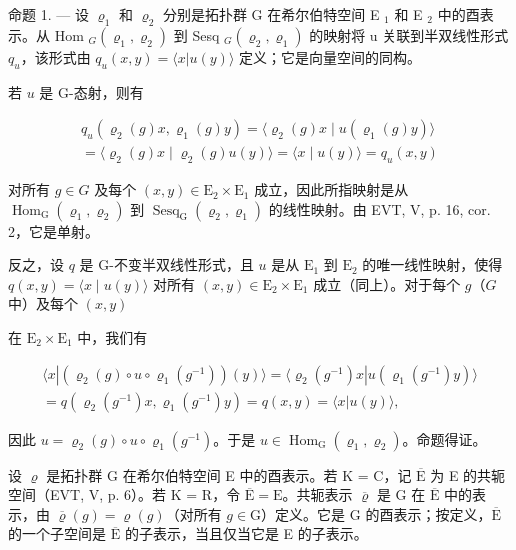 命题 1. --- 设 \(\varrho_{1}\) 和 \(\varrho_{2}\) 分别是拓扑群 G 在希尔伯特空间 E \(_{1}\) 和 E \(_{2}\) 中的酉表示。从 Hom \(_{G}(\varrho_{1},\varrho_{2})\) 到 Sesq \(_{G}(\varrho_{2},\varrho_{1})\) 的映射将 u 关联到半双线性形式 \(q_{u}\)，该形式由 \(q_{u}(x,y)=\langle x|u(y)\rangle\) 定义；它是向量空间的同构。

若 \(u\) 是 G-态射，则有

\[
\begin{array}{c} q _ {u} (\varrho_ {2} (g) x, \varrho_ {1} (g) y) = \langle \varrho_ {2} (g) x \mid u (\varrho_ {1} (g)y) \rangle \\ = \langle \varrho_ {2} (g) x \mid \varrho_ {2} (g) u (y) \rangle = \langle x \mid u (y) \rangle = q _ {u} (x, y) \end{array}
\]

对所有 \(g \in G\) 及每个 \((x, y) \in \mathrm{E}_{2} \times \mathrm{E}_{1}\) 成立，因此所指映射是从 \(\operatorname{Hom}_{\mathrm{G}}(\varrho_{1}, \varrho_{2})\) 到 \(\operatorname{Sesq}_{\mathrm{G}}(\varrho_{2}, \varrho_{1})\) 的线性映射。由 EVT, V, p. 16, cor. 2，它是单射。

反之，设 \(q\) 是 G-不变半双线性形式，且 \(u\) 是从 \(\mathrm{E}_1\) 到 \(\mathrm{E}_2\) 的唯一线性映射，使得 \(q(x,y) = \langle x \mid u(y) \rangle\) 对所有 \((x,y) \in \mathrm{E}_2 \times \mathrm{E}_1\) 成立（同上）。对于每个 \(g\)（\(G\) 中）及每个 \((x,y)\)

在 \(\mathrm{E}_2\times \mathrm{E}_1\) 中，我们有

\[
\begin{array}{c} \langle x | (\varrho_ {2} (g) \circ u \circ \varrho_ {1} (g ^ {- 1})) (y) \rangle = \langle \varrho_ {2} (g ^ {- 1}) x | u (\varrho_ {1} (g ^ {- 1}) y) \rangle \\ = q (\varrho_ {2} (g ^ {- 1}) x, \varrho_ {1} (g ^ {- 1}) y) = q (x, y) = \langle x | u (y) \rangle , \end{array}
\]

因此 \(u = \varrho_{2}(g) \circ u \circ \varrho_{1}(g^{-1})\)。于是 \(u \in \operatorname{Hom}_{\mathrm{G}}(\varrho_{1}, \varrho_{2})\)。命题得证。

设 \(\varrho\) 是拓扑群 G 在希尔伯特空间 E 中的酉表示。若 K = C，记 \(\overline{\mathrm{E}}\) 为 E 的共轭空间（EVT, V, p. 6）。若 K = R，令 \(\overline{\mathrm{E}} = \mathrm{E}\)。共轭表示 \(\overline{\varrho}\) 是 G 在 \(\overline{\mathrm{E}}\) 中的表示，由 \(\overline{\varrho}(g) = \varrho(g)\)（对所有 \(g \in \mathrm{G}\)）定义。它是 G 的酉表示；按定义，\(\overline{\mathrm{E}}\) 的一个子空间是 \(\overline{\mathrm{E}}\) 的子表示，当且仅当它是 E 的子表示。

